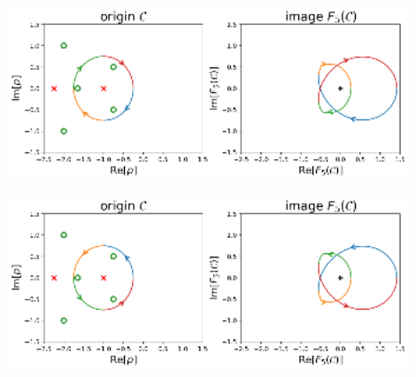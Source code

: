 \begin{center}
    \includegraphics[width=0.9\textwidth]{notebook/fig/output_46_1.eps}
\end{center}
\begin{center}
    \includegraphics[width=0.9\textwidth]{notebook/fig/output_47_1.eps}
\end{center}
